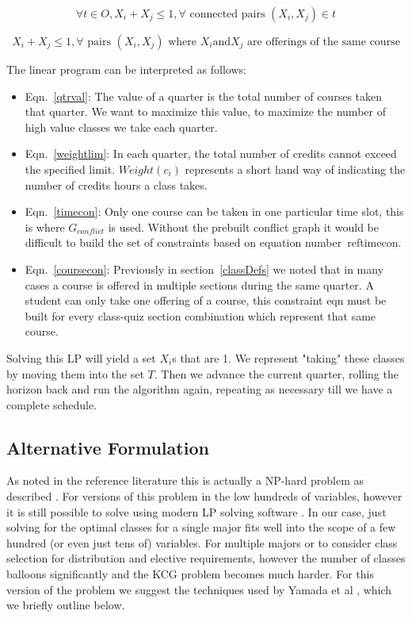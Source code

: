 \documentclass[11pt]{article} %
\begin{document}
\begin{equation}
    \forall t \in O,X_i+X_j \leq 1, \forall \text{ connected pairs } (X_i,X_j) \in t
    \label{timecon}
\end{equation}

\begin{equation}
   X_i + X_j \leq 1, \forall \text{ pairs } (X_i,X_j) \text{ where } X_i \text{and} X_j \text{ are offerings of
   the same course}
    \label{coursecon}
\end{equation}

The linear program can be interpreted as follows: \begin{itemize} \item
Eqn.~\ref{qtrval}: The value of a quarter is the total number of courses taken
that quarter. We want to maximize this value, to maximize the number of high
value classes we take each quarter. \item Eqn.~\ref{weightlim}: In each quarter,
the total number of credits cannot exceed the specified limit. $Weight(c_i)$
represents a short hand way of indicating the number of credits hours a class
takes. \item Eqn.~\ref{timecon}: Only one course can be taken in one particular
time slot, this is where $G_{conflict}$ is used. Without the prebuilt conflict
graph it would be difficult to build the set of constraints based on equation
number~ref{timecon}. \item Eqn.~\ref{coursecon}: Previously in
section~\ref{classDefs} we noted that in many cases a course is offered in
multiple sections during the same quarter. A student can only take one offering
of a course, this constraint eqn must be built for every class-quiz section
combination which represent that same course.\end{itemize}

Solving this LP will yield a set $X_i$s that are 1. We represent "taking" these
classes by moving them into the set $T$. Then we advance the current quarter,
rolling the horizon back and run the algorithm again, repeating as necessary
till we have a complete schedule.

\subsection{Alternative Formulation} As noted in the reference literature this
is actually a NP-hard problem as described \cite{pferschy:kcg}.  For versions of
this problem in the low hundreds of variables, however it is still possible to
solve using modern LP solving software \cite{yamada:heuristic}. In our case,
just solving for the optimal classes for a single major fits well into the scope
of a few hundred (or even just tens of) variables. For multiple majors or to
consider class selection for distribution and elective requirements, however the
number of classes balloons significantly and the KCG problem becomes much
harder. For this version of the problem we suggest the techniques used by Yamada
et al \cite{yamada:heuristic}, which we briefly outline below.
\end{document}
